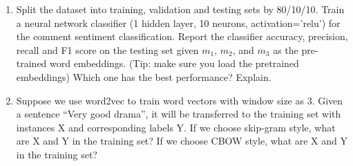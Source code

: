 \documentclass[conference]{IEEEtran}
\begin{document}
\begin{enumerate}
\item Split the dataset into training, validation and testing sets by 80/10/10. Train a neural network classifier (1 hidden layer, 10 neurons, activation='relu') for the comment sentiment classification. Report the classifier accuracy, precision, recall and F1 score on the testing set given $m_1$, $m_2$, and $m_3$ as the pre-trained word embeddings. (Tip: make sure you load the pretrained embeddings) Which one has the best performance? Explain.\\

\item Suppose we use word2vec to train word vectors with window size as 3. Given a sentence “Very good drama”, it will be transferred to the training set with instances X and corresponding labels Y. If we choose skip-gram style, what are X and Y in the training set? If we choose CBOW style, what are X and Y in the training set?\\

\end{enumerate}
\newpage
\end{document}
